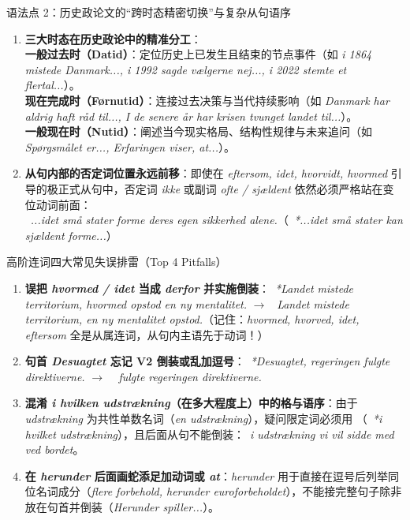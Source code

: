 \begin{grammatikbox}{语法点 2：历史政论文的“跨时态精密切换”与复杂从句语序}
\begin{enumerate}
  \item \textbf{三大时态在历史政论中的精准分工}：\\
     \textbf{一般过去时（Datid）}：定位历史上已发生且结束的节点事件（如 \textit{i 1864 mistede Danmark..., i 1992 sagde vælgerne nej..., i 2022 stemte et flertal...}）。\\
     \textbf{现在完成时（Førnutid）}：连接过去决策与当代持续影响（如 \textit{Danmark har aldrig haft råd til..., I de senere år har krisen tvunget landet til...}）。\\
     \textbf{一般现在时（Nutid）}：阐述当今现实格局、结构性规律与未来追问（如 \textit{Spørgsmålet er..., Erfaringen viser, at...}）。
  \item \textbf{从句内部的否定词位置永远前移}：即使在 \textit{eftersom, idet, hvorvidt, hvormed} 引导的极正式从句中，否定词 \textit{ikke} 或副词 \textit{ofte / sjældent} 依然必须严格站在变位动词前面：\\
    \ \textit{...idet små stater  forme deres egen sikkerhed alene.}（\ \textit{*...idet små stater kan sjældent forme...}）
\end{enumerate}
\end{grammatikbox}

\begin{grammatikbox}{高阶连词四大常见失误排雷（Top 4 Pitfalls）}
\begin{enumerate}
  \item \textbf{ 误把 \textit{hvormed / idet} 当成 \textit{derfor} 并实施倒装}：\ \textit{*Landet mistede territorium, hvormed opstod en ny mentalitet.} $\rightarrow$ \ \textit{Landet mistede territorium,  en ny mentalitet opstod.}（记住：\textit{hvormed, hvorved, idet, eftersom} 全是从属连词，从句内主语先于动词！）
  \item \textbf{ 句首 \textit{Desuagtet} 忘记 V2 倒装或乱加逗号}：\ \textit{*Desuagtet, regeringen fulgte direktiverne.} $\rightarrow$ \ \textit{ fulgte regeringen direktiverne.}
  \item \textbf{ 混淆 \textit{i hvilken udstrækning}（在多大程度上）中的格与语序}：由于 \textit{udstrækning} 为共性单数名词（\textit{en udstrækning}），疑问限定词必须用 （\ \textit{*i hvilket udstrækning}），且后面从句不能倒装：\ \textit{i  udstrækning vi vil sidde med ved bordet}。
  \item \textbf{ 在 \textit{herunder} 后面画蛇添足加动词或 \textit{at}}：\textit{herunder} 用于直接在逗号后列举同位名词成分（\textit{flere forbehold, herunder euroforbeholdet}），不能接完整句子除非放在句首并倒装（\textit{Herunder spiller...}）。
\end{enumerate}
\end{grammatikbox}

